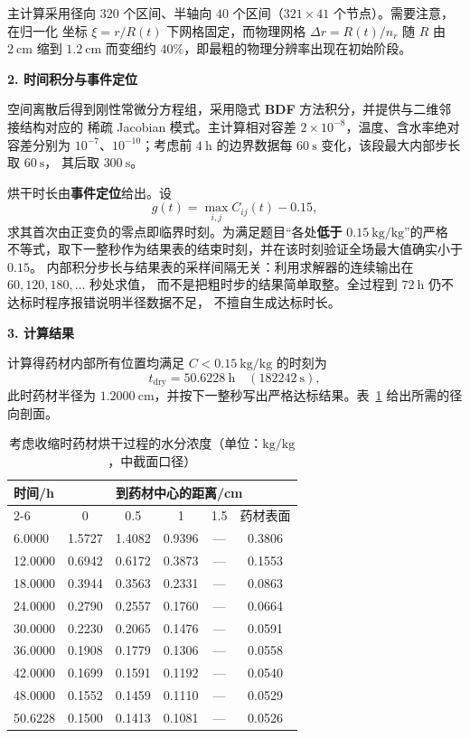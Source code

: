 \documentclass[12pt,a4paper]{ctexart}
\begin{document}
主计算采用径向 $320$ 个区间、半轴向 $40$ 个区间（$321\times41$ 个节点）。需要注意，在归一化
坐标 $\xi=r/R(t)$ 下网格固定，而物理网格 $\Delta r=R(t)/n_r$ 随 $R$ 由 $2\ \mathrm{cm}$ 缩到
$1.2\ \mathrm{cm}$ 而变细约 $40\%$，即最粗的物理分辨率出现在初始阶段。

\textbf{2. 时间积分与事件定位}

空间离散后得到刚性常微分方程组，采用隐式 \textbf{BDF} 方法积分，并提供与二维邻接结构对应的
稀疏 Jacobian 模式。主计算相对容差 $2\times10^{-8}$，温度、含水率绝对容差分别为 $10^{-7}$、$10^{-10}$；考虑前
$4\ \mathrm{h}$ 的边界数据每 $60\ \mathrm{s}$ 变化，该段最大内部步长取 $60\ \mathrm{s}$，
其后取 $300\ \mathrm{s}$。

烘干时长由\textbf{事件定位}给出。设
\begin{equation}
g(t)=\max_{i,j}C_{ij}(t)-0.15 ,
\label{eq:p4event}
\end{equation}
求其首次由正变负的零点即临界时刻。为满足题目“各处\textbf{低于} $0.15\ \mathrm{kg/kg}$”的严格
不等式，取下一整秒作为结果表的结束时刻，并在该时刻验证全场最大值确实小于 $0.15$。
内部积分步长与结果表的采样间隔无关：利用求解器的连续输出在 $60,120,180,\dots$ 秒处求值，
而不是把粗时步的结果简单取整。全过程到 $72\ \mathrm{h}$ 仍不达标时程序报错说明半径数据不足，
不擅自生成达标时长。

\textbf{3. 计算结果}

计算得药材内部所有位置均满足 $C<0.15\ \mathrm{kg/kg}$ 的时刻为
\begin{equation}
t_{\mathrm{dry}}=50.6228\ \mathrm{h}\quad(182242\ \mathrm{s}),
\label{eq:p4drytime}
\end{equation}
此时药材半径为 $1.2000\ \mathrm{cm}$，并按下一整秒写出严格达标结果。表~\ref{tab:C4} 给出所需的径向剖面。

\begin{table}[H]
\centering
\small
\begin{tabular}{lccccc}
\toprule
\multirow{2}{*}{时间/h} & \multicolumn{5}{c}{到药材中心的距离/cm} \\
\cmidrule(lr){2-6}
 & 0 & 0.5 & 1 & 1.5 & 药材表面 \\

\midrule
6.0000   & 1.5727 & 1.4082 & 0.9396 & --- & 0.3806 \\
12.0000  & 0.6942 & 0.6172 & 0.3873 & --- & 0.1553 \\
18.0000  & 0.3944 & 0.3563 & 0.2331 & --- & 0.0863 \\
24.0000  & 0.2790 & 0.2557 & 0.1760 & --- & 0.0664 \\
30.0000  & 0.2230 & 0.2065 & 0.1476 & --- & 0.0591 \\
36.0000  & 0.1908 & 0.1779 & 0.1306 & --- & 0.0558 \\
42.0000  & 0.1699 & 0.1591 & 0.1192 & --- & 0.0540 \\
48.0000  & 0.1552 & 0.1459 & 0.1110 & --- & 0.0529 \\
50.6228  & 0.1500 & 0.1413 & 0.1081 & --- & 0.0526 \\
\bottomrule
\end{tabular}
\caption{考虑收缩时药材烘干过程的水分浓度（单位：$\mathrm{kg/kg}$，中截面口径）}
\label{tab:C4}
\end{table}
\end{document}
